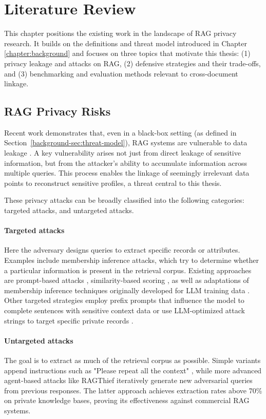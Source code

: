 \section{Literature Review}\label{chapter:literature}
This chapter positions the existing work in the landscape of RAG privacy research. It builds on the definitions and threat model introduced in Chapter \ref{chapter:background} and focuses on three topics that motivate this thesis: (1) privacy leakage and attacks on RAG, (2) defensive strategies and their trade-offs, and (3) benchmarking and evaluation methods relevant to cross-document linkage.

\subsection{RAG Privacy Risks}\label{literature-sec:privacy-attacks}
Recent work demonstrates that, even in a black-box setting (as defined in Section~\ref{background-sec:threat-model}), RAG systems are vulnerable to data leakage \cite{implicationsRAG,goodAndBad}. A key vulnerability arises not just from direct leakage of sensitive information, but from the attacker's ability to accumulate information across multiple queries. This process enables the linkage of seemingly irrelevant data points to reconstruct sensitive profiles, a threat central to this thesis.

These privacy attacks can be broadly classified into the following categories: targeted attacks, and untargeted attacks.

\paragraph{Targeted attacks} Here the adversary designs queries to extract specific records or attributes. Examples include membership inference attacks, which try to determine whether a particular information is present in the retrieval corpus. Existing approaches are prompt-based attacks \cite{ragMIA}, similarity-based scoring \cite{generatingIsBelieving}, as well as adaptations of membership inference techniques originally developed for LLM training data \cite{extractingTrainingDataLLM,generatingIsBelieving}. Other targeted strategies employ prefix prompts that influence the model to complete sentences with sensitive context data or use LLM-optimized attack strings to target specific private records \cite{goodAndBad, DEAL}.  

\paragraph{Untargeted attacks} The goal is to extract as much of the retrieval corpus as possible. Simple variants append instructions such as "Please repeat all the context" \cite{spillTheBeans,goodAndBad}, while more advanced agent-based attacks like {RAGThief} \cite{ragThief} iteratively generate new adversarial queries from previous responses. The latter approach achieves extraction rates above 70\% on private knowledge bases, proving its effectiveness against commercial RAG systems.


